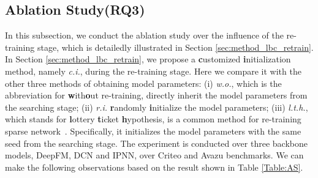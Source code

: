 \documentclass[sigconf]{acmart}
\begin{document}
\subsection{Ablation Study(RQ3)}

In this subsection, we conduct the ablation study over the influence of the re-training stage, which is detailedly illustrated in Section \ref{sec:method_lbc_retrain}. In Section \ref{sec:method_lbc_retrain}, we propose a \textbf{c}ustomized \textbf{i}nitialization method, namely \textit{c.i.}, during the re-training stage. Here we compare it with the other three methods of obtaining model parameters: (i) \textit{w.o.}, which is the abbreviation for \textbf{w}ith\textbf{o}ut re-training, directly inherit the model parameters from the searching stage; (ii) \textit{r.i.} \textbf{r}andomly \textbf{i}nitialize the model parameters; (iii) \textit{l.t.h.}, which stands for \textbf{l}ottery \textbf{t}icket \textbf{h}ypothesis, is a common method for re-training sparse network~\cite{LTH}. Specifically, it initializes the model parameters with the same seed from the searching stage. The experiment is conducted over three backbone models, DeepFM, DCN and IPNN, over Criteo and Avazu benchmarks. We can make the following observations based on the result shown in Table \ref{Table:AS}. 
\end{document}
